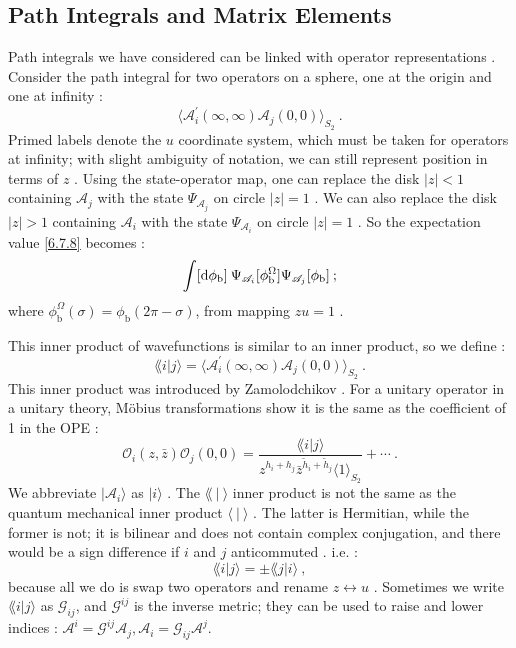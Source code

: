 \subsection*{Path Integrals and Matrix Elements}
Path integrals we have considered can be linked with operator representations . Consider the path integral for two operators on a sphere, one at the origin and one at infinity :
\begin{equation}
	\bigl\langle\mathscr{A}_{i}^{\prime}(\infty, \infty) \mathscr{A}_{j}(0,0)\bigr\rangle_{S_{2}} \:. \label{6.7.8}
\end{equation}
Primed labels denote the $u$ coordinate system, which must be taken for operators at infinity; with slight ambiguity of notation, we can still represent position in terms of $z$ . Using the state-operator map, one can replace the disk $|z|<1$ containing $\mathscr{A}_{j}$ with the state $\Psi_{\mathscr{A}_{j}}$ on circle $|z|=1$ . We can also replace the disk $|z|>1$ containing $\mathscr{A}_{i}$ with the state $\Psi_{\mathscr{A}_{i}}$ on circle $|z|=1$ . So the expectation value \eqref{6.7.8} becomes :
\begin{equation}
	\int[\mathrm{d} \phi_{\mathrm{b}}]\: \Psi_{\mathscr{A}_{i}}[\phi_{\mathrm{b}}^{\Omega}] 
	\Psi_{\mathscr{A}_{j}}[\phi_{\mathrm{b}}] \:; \label{6.7.9}
\end{equation}
where $\phi_{\mathrm{b}}^{\Omega}(\sigma)=\phi_{\mathrm{b}}(2 \pi-\sigma)$, from mapping $z u=1$ .

This inner product of wavefunctions is similar to an inner product, so we define :
\begin{equation}
	\lAngle i \vert j\rangle = \bigl\langle\mathscr{A}_{i}^{\prime}(\infty, \infty) \mathscr{A}_{j}(0,0)\bigr\rangle_{S_{2}} \:. \label{6.7.10}
\end{equation}
This inner product was introduced by Zamolodchikov . For a unitary operator in a unitary theory, Möbius transformations show it is the same as the coefficient of 1 in the OPE :
\begin{equation}
	\mathcal{O}_{i}(z, \bar{z}) \mathcal{O}_{j}(0,0)=\frac{\lAngle i \vert j\rangle}{z^{h_{i}+h_{j}} \bar{z}^{\tilde{h}_{i}+\tilde{h}_{j}}\langle 1\rangle_{S_{2}}}+\cdots \:. \label{6.7.11}
\end{equation}
We abbreviate $|\mathscr{A}_{i}\rangle$ as $|i\rangle$ . The $\lAngle \: |\: \rangle$ inner product is not the same as the quantum mechanical inner product $\langle\: |\:\rangle$ . The latter is Hermitian, while the former is not; it is bilinear and does not contain complex conjugation, and there would be a sign difference if $i$ and $j$ anticommuted  . i.e. :
\begin{equation}
	\lAngle i \vert j\rangle= \pm \lAngle j \vert i\rangle \:, \label{6.7.12}
\end{equation}
because all we do is swap two operators and rename $z\leftrightarrow u$ . Sometimes we write $\lAngle i \vert j\rangle$ as $\mathscr{G}_{i j}$, and $\mathscr{G}^{i j}$ is the inverse metric; they can be used to raise and lower indices : $\mathscr{A}^{i}=\mathscr{G}^{i j} \mathscr{A}_{j}, \mathscr{A}_{i}=\mathscr{G}_{i j} \mathscr{A}^{j}$. 

